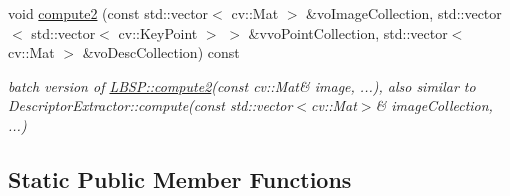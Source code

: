\begin{DoxyCompactItemize}
void \mbox{\hyperlink{class_l_b_s_p_af02407f0a1657cd3e2b955aa250d064e}{compute2}} (const std\+::vector$<$ cv\+::\+Mat $>$ \&vo\+Image\+Collection, std\+::vector$<$ std\+::vector$<$ cv\+::\+Key\+Point $>$ $>$ \&vvo\+Point\+Collection, std\+::vector$<$ cv\+::\+Mat $>$ \&vo\+Desc\+Collection) const
\begin{DoxyCompactList}\small\item\em batch version of \mbox{\hyperlink{class_l_b_s_p_ab61148341758dbc004660761bca04f84}{L\+B\+S\+P\+::compute2}}(const cv\+::\+Mat\& image, ...), also similar to Descriptor\+Extractor\+::compute(const std\+::vector$<$cv\+::\+Mat$>$\& image\+Collection, ...) \end{DoxyCompactList}\end{DoxyCompactItemize}
\subsection*{Static Public Member Functions}
